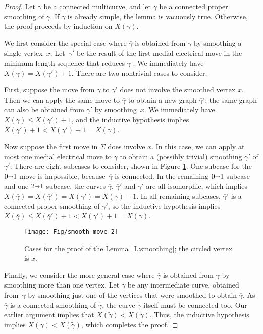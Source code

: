 \documentclass[11pt,twoside]{article}
\def\arcto{\mathord\shortrightarrow}
\def\arc#1#2{#1\arcto#2}
\let\EDIT\relax
\numberwithin{figure}{section}
\begin{document}
\begin{proof}
Let $γ$ be a connected multicurve, and let $\overline{γ}$ be a connected proper smoothing of $γ$.  If $γ$ is already simple, the lemma is vacuously true.  Otherwise, the proof proceeds by induction on $X(γ)$.

We first consider the special case where $\overline{γ}$ is obtained from $γ$ by smoothing a single vertex~$x$.  Let~$γ'$ be the result of the first medial electrical move in the minimum-length sequence that reduces $γ$ \EDIT{to a simple closed curve}.  We immediately have $X(γ) = X(γ')+1$.  There are two nontrivial cases to consider.

First, suppose the move from $γ$ to $γ'$ does not involve the smoothed vertex $x$.  Then we can apply the same move to $\overline{γ}$ to obtain a new graph $\overline{γ}'$; the same graph  can also be obtained from $γ'$ by smoothing~$x$.  We immediately have $X(\overline{γ}) \le X(\overline{γ}') + 1$, and the inductive hypothesis implies $X(\overline{γ}')+1 < X(γ')+1 = X(γ)$.

Now suppose the first move in $Σ$ does involve $x$. In this case, we can apply at most one medial electrical move to $\overline{γ}$ to obtain a (possibly trivial) smoothing $\overline{γ}'$ of $γ'$.  There are eight subcases to consider, shown in Figure \ref{F:smooth-moves}.  One subcase for the $\arc01$ move is impossible, because~$\overline{γ}$ is connected.  In the remaining $\arc01$ subcase and one $\arc21$ subcase, the curves $\overline{γ}$, $\overline{γ}'$ and $γ'$ are all isomorphic, which implies $X(\overline{γ}) = X(\overline{γ}') = X(γ') = X(γ)-1$.  In all remaining subcases, $\overline{γ}'$ is a connected proper smoothing of $γ'$, so the inductive hypothesis implies $X(\overline{γ}) ≤ X(\overline{γ}')+1 < X(γ')+1 = X(γ)$.

\begin{figure}[ht]
\centering
\texttt{[image: Fig/smooth-move-2]}
\caption{Cases for the proof of the Lemma~\ref{L:smoothing}; the circled vertex is $x$.}
\label{F:smooth-moves}
\end{figure}

Finally, we consider the more general case where $\overline{γ}$ is obtained from $γ$ by smoothing more than one vertex.  Let $\widetilde{γ}$ be any intermediate curve, obtained from~$γ$ by smoothing just one of the vertices that were smoothed to obtain $\overline{γ}$.  As $\overline{γ}$ is a connected smoothing of $\widetilde{γ}$, the curve $\widetilde{γ}$ itself must be connected too.
Our earlier argument implies that $X(\widetilde{γ}) < X(γ)$.  Thus, the inductive hypothesis implies $X(\overline{γ}) < X(\widetilde{γ})$, which completes the proof.
\end{proof}
\end{document}
